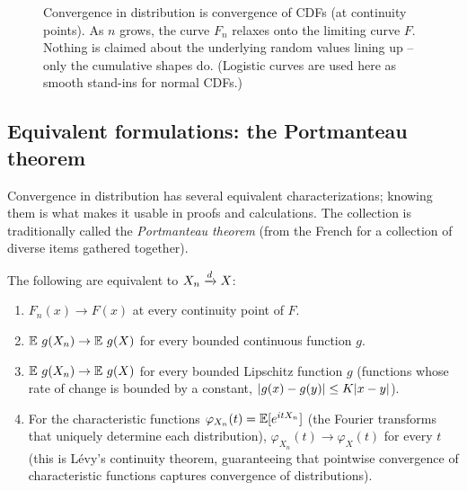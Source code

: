 \begin{figure}[H]
\centering
{}
\caption{Convergence in distribution is convergence of CDFs (at continuity points).
As $n$ grows, the curve $F_n$ relaxes onto the limiting curve $F$. Nothing is claimed
about the underlying random values lining up -- only the cumulative shapes do.
(Logistic curves are used here as smooth stand-ins for normal CDFs.)}
\label{ch22:fig-cdf-conv}
\end{figure}

\subsection{Equivalent formulations: the Portmanteau theorem}
\label{ch22:portmanteau}

Convergence in distribution has several equivalent characterizations; knowing them is what
makes it usable in proofs and calculations. The collection is traditionally called the \emph{Portmanteau theorem}
(from the French for a collection of diverse items gathered together).

\begin{theorem}
\label{ch22:thm-portmanteau}
The following are equivalent to $X_n \xrightarrow{d} X$:
\begin{enumerate}
\item $F_n(x)\to F(x)$ at every continuity point of $F$.
\item $\operatorname{\mathbb{E}}\, g(X_n) \to \operatorname{\mathbb{E}}\, g(X)$ for every bounded continuous function $g$.
\item $\operatorname{\mathbb{E}}\, g(X_n) \to \operatorname{\mathbb{E}}\, g(X)$ for every bounded Lipschitz function $g$ (functions
      whose rate of change is bounded by a constant, $\lvert g(x)-g(y)\rvert\le K\lvert x-y\rvert$).
\item For the characteristic functions $\varphi_{X_n}(t) = \operatorname{\mathbb{E}}[e^{itX_n}]$ (the Fourier
      transforms that uniquely determine each distribution), $\varphi_{X_n}(t)\to\varphi_X(t)$
      for every $t$ (this is L\'evy's continuity theorem, guaranteeing that pointwise
      convergence of characteristic functions captures convergence of distributions).
\end{enumerate}
\end{theorem}

